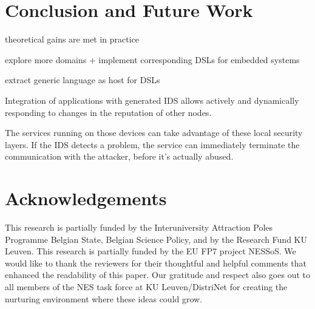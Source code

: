 \documentclass[conference]{IEEEtran}
\begin{document}
\section{Conclusion and Future Work}
\label{conclusion}

theoretical gains are met in practice

explore more domains + implement corresponding DSLs for embedded systems

extract generic language as host for DSLs

Integration of applications with generated IDS allows actively and dynamically
responding to changes in the reputation of other nodes.

The services running on those devices can take advantage of these local
security layers. If the IDS detects a problem, the service can immediately
terminate the communication with the attacker, before it's actually abused.

\section*{Acknowledgements}

This research is partially funded by the Interuniversity Attraction Poles
Programme Belgian State, Belgian Science Policy, and by the Research Fund KU
Leuven. This research is partially funded by the EU FP7 project NESSoS. We
would like to thank the reviewers for their thoughtful and helpful comments
that enhanced the readability of this paper. Our gratitude and respect also
goes out to all members of the NES task force at KU Leuven/DistriNet for
creating the nurturing environment where these ideas could grow.



\end{document}
